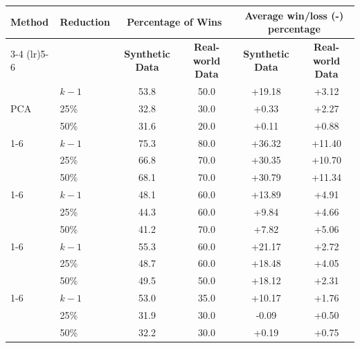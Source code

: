 \begin{tabular}{l l cc cc}
\toprule
\textbf{Method} & \textbf{Reduction} & \multicolumn{2}{c}{\textbf{Percentage of Wins}} & \multicolumn{2}{c}{\textbf{Average win/loss (-) percentage}} \\
\cmidrule(lr){3-4} \cmidrule(lr){5-6}
& & \textbf{Synthetic Data} & \textbf{Real-world Data} & \textbf{Synthetic Data} & \textbf{Real-world Data} \\
\midrule
\multirow{3}{*}{PCA} & $k-1$ & 53.8 & 50.0 & +19.18 & +3.12 \\
 & 25\% & 32.8 & 30.0 & +0.33 & +2.27 \\
 & 50\% & 31.6 & 20.0 & +0.11 & +0.88 \\
\cmidrule(lr){1-6}
\multirow{3}{*}{Kernel PCA} & $k-1$ & 75.3 & 80.0 & +36.32 & +11.40 \\
 & 25\% & 66.8 & 70.0 & +30.35 & +10.70 \\
 & 50\% & 68.1 & 70.0 & +30.79 & +11.34 \\
\cmidrule(lr){1-6}
\multirow{3}{*}{VAE} & $k-1$ & 48.1 & 60.0 & +13.89 & +4.91 \\
 & 25\% & 44.3 & 60.0 & +9.84 & +4.66 \\
 & 50\% & 41.2 & 70.0 & +7.82 & +5.06 \\
\cmidrule(lr){1-6}
\multirow{3}{*}{Isomap} & $k-1$ & 55.3 & 60.0 & +21.17 & +2.72 \\
 & 25\% & 48.7 & 60.0 & +18.48 & +4.05 \\
 & 50\% & 49.5 & 50.0 & +18.12 & +2.31 \\
\cmidrule(lr){1-6}
\multirow{3}{*}{MDS} & $k-1$ & 53.0 & 35.0 & +10.17 & +1.76 \\
 & 25\% & 31.9 & 30.0 & -0.09 & +0.50 \\
 & 50\% & 32.2 & 30.0 & +0.19 & +0.75 \\
\bottomrule\end{tabular}
